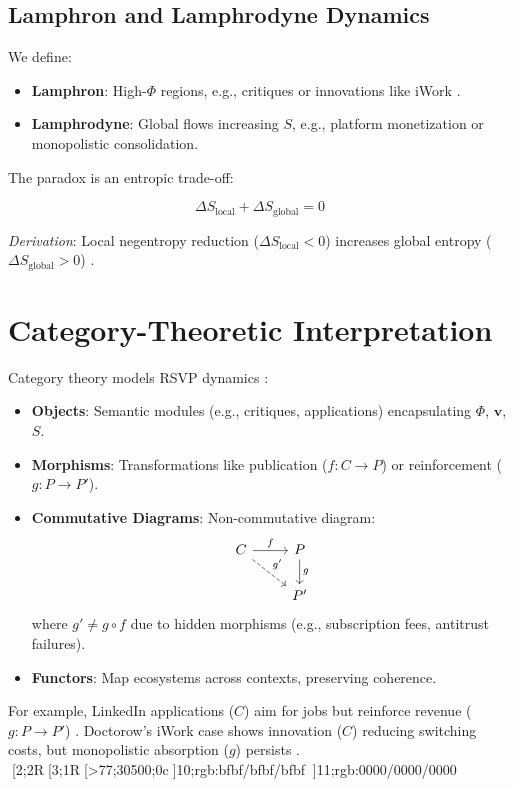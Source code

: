 \documentclass{article}
\begin{document}
\subsection{Lamphron and Lamphrodyne Dynamics}

We define:

\begin{itemize}
    \item \textbf{Lamphron}: High-$\Phi$ regions, e.g., critiques or innovations like iWork \cite{doctorow2023internetcon}.
    \item \textbf{Lamphrodyne}: Global flows increasing $S$, e.g., platform monetization or monopolistic consolidation.
\end{itemize}

The paradox is an entropic trade-off:

\[
\Delta S_{\text{local}} + \Delta S_{\text{global}} = 0
\]

\emph{Derivation}: Local negentropy reduction ($\Delta S_{\text{local}} < 0$) increases global entropy ($\Delta S_{\text{global}} > 0$) \cite{shannon1948}.

\section{Category-Theoretic Interpretation}
\label{sec:category}

Category theory models RSVP dynamics \cite{lawvere2009}:

\begin{itemize}
    \item \textbf{Objects}: Semantic modules (e.g., critiques, applications) encapsulating $\Phi$, $\mathbf{v}$, $S$.
    \item \textbf{Morphisms}: Transformations like publication ($f: C \to P$) or reinforcement ($g: P \to P'$).
    \item \textbf{Commutative Diagrams}: Non-commutative diagram:
    \[
    \begin{tikzcd}
        C \arrow[r, "f"] \arrow[rd, "g'", dashed] & P \arrow[d, "g"] \\
        & P'
    \end{tikzcd}
    \]
    where $g' \neq g \circ f$ due to hidden morphisms (e.g., subscription fees, antitrust failures).
    \item \textbf{Functors}: Map ecosystems across contexts, preserving coherence.
\end{itemize}

For example, LinkedIn applications ($C$) aim for jobs but reinforce revenue ($g: P \to P'$) \cite{ghedau2025linkedin}. Doctorow’s iWork case shows innovation ($C$) reducing switching costs, but monopolistic absorption ($g$) persists \cite{doctorow2023internetcon}.
[2;2R[3;1R[>77;30500;0c]10;rgb:bfbf/bfbf/bfbf]11;rgb:0000/0000/0000
\end{document}
